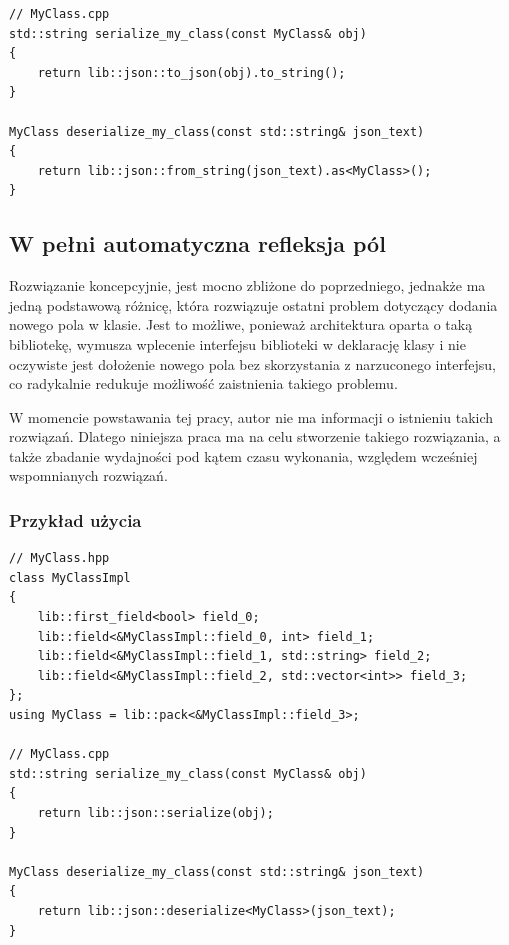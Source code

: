 \documentclass[12pt]{article}
\newcommand{\n}{\newline}
\begin{document}
{{{\begin{lstlisting}[frame=single]
// MyClass.cpp
std::string serialize_my_class(const MyClass& obj)
{
	return lib::json::to_json(obj).to_string();
}

MyClass deserialize_my_class(const std::string& json_text)
{
	return lib::json::from_string(json_text).as<MyClass>();
}
				\end{lstlisting}
			}
		}

		{
			\subsection{W pełni automatyczna refleksja pól}

			Rozwiązanie koncepcyjnie, jest mocno zbliżone do poprzedniego, jednakże ma jedną podstawową różnicę, która rozwiązuje ostatni
			problem dotyczący dodania nowego pola w klasie. Jest to możliwe, ponieważ architektura oparta o taką bibliotekę, wymusza wplecenie
			interfejsu biblioteki w deklarację klasy i nie oczywiste jest dołożenie nowego pola bez skorzystania z narzuconego interfejsu, co
			radykalnie redukuje możliwość zaistnienia takiego problemu.\n

			W momencie powstawania tej pracy, autor nie ma informacji o istnieniu takich rozwiązań. Dlatego niniejsza praca ma na celu
			stworzenie takiego rozwiązania, a także zbadanie wydajności pod kątem czasu wykonania, względem wcześniej wspomnianych rozwiązań.

			{
				\subsubsection{Przykład użycia}

				\begin{lstlisting}[frame=single]
// MyClass.hpp
class MyClassImpl
{
	lib::first_field<bool> field_0;
	lib::field<&MyClassImpl::field_0, int> field_1;
	lib::field<&MyClassImpl::field_1, std::string> field_2;
	lib::field<&MyClassImpl::field_2, std::vector<int>> field_3;
};
using MyClass = lib::pack<&MyClassImpl::field_3>;

// MyClass.cpp
std::string serialize_my_class(const MyClass& obj)
{
	return lib::json::serialize(obj);
}

MyClass deserialize_my_class(const std::string& json_text)
{
	return lib::json::deserialize<MyClass>(json_text);
}
				\end{lstlisting}
			}

		}
	}
\end{document}
